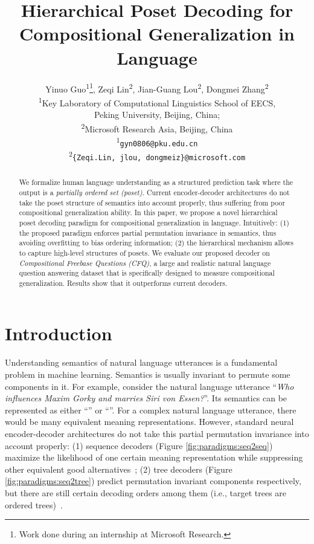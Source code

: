 \documentclass{article}
\title{Hierarchical Poset Decoding for Compositional Generalization in Language}
\author{Yinuo Guo\textsuperscript{\rm 1}\thanks{Work done during an internship at Microsoft Research.}, Zeqi Lin\textsuperscript{\rm 2}, Jian-Guang Lou\textsuperscript{\rm 2}, Dongmei Zhang\textsuperscript{\rm 2} \\
  \textsuperscript{\rm 1}Key Laboratory of Computational Linguistics
School of EECS, \\
Peking University, Beijing, China;\\
\textsuperscript{\rm 2}Microsoft Research Asia, Beijing, China \\
  \textsuperscript{\rm 1}\texttt{gyn0806@pku.edu.cn} \\
   \textsuperscript{\rm 2}\texttt{\{Zeqi.Lin, jlou, dongmeiz\}@microsoft.com} \\
}
\begin{document}
\maketitle

\begin{abstract}

We formalize human language understanding as a structured prediction task where the output is a \emph{partially ordered set (poset)}.
Current encoder-decoder architectures do not take the poset structure of semantics into account properly, thus suffering from poor compositional generalization ability.
In this paper, we propose a novel hierarchical poset decoding paradigm for compositional generalization in language.
Intuitively:
(1) the proposed paradigm enforces partial permutation invariance in semantics, thus avoiding overfitting to bias ordering information;
(2) the hierarchical mechanism allows to capture high-level structures of posets.
We evaluate our proposed decoder on \emph{Compositional Freebase Questions (CFQ)}, a large and realistic natural language question answering dataset that is specifically designed to measure compositional generalization.
Results show that it outperforms current decoders.

\end{abstract}

\section{Introduction}

Understanding semantics of natural language utterances
is a fundamental problem in machine learning.
Semantics is usually invariant to permute some components in it.
For example, consider the natural language utterance ``\emph{Who influences Maxim Gorky and marries Siri von Essen?}''.
Its semantics can be represented as either ``'' or ``''.
For a complex natural language utterance, there would be many equivalent meaning representations.
However, standard neural encoder-decoder architectures do not take this partial permutation invariance into account properly:
(1) sequence decoders (Figure \ref{fig:paradigms:seq2seq}) maximize the likelihood of one certain meaning representation while suppressing other equivalent good alternatives~\citep{sutskever2014sequence,bahdanau2014neural};
(2) tree decoders (Figure \ref{fig:paradigms:seq2tree}) predict permutation invariant components respectively, but there are still certain decoding orders among them (i.e., target trees are ordered trees)~\citep{dong-lapata-2016-language,polosukhin2018neural}.
\end{document}
